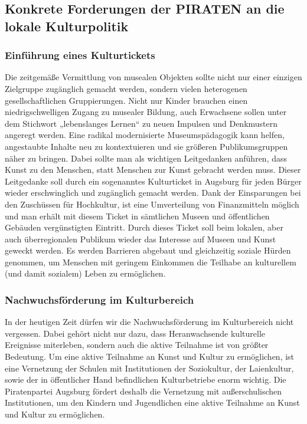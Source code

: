   \subsection{Konkrete Forderungen der PIRATEN an die lokale Kulturpolitik}
  
  \subsubsection{Einführung eines Kulturtickets}
  
  Die zeitgemäße Vermittlung von musealen Objekten sollte nicht nur einer 
  einzigen Zielgruppe zugänglich gemacht werden, sondern vielen heterogenen 
  gesellschaftlichen Gruppierungen. Nicht nur Kinder brauchen einen 
  niedrigschwelligen Zugang zu musealer Bildung, auch Erwachsene sollen unter 
  dem Stichwort „lebenslanges Lernen“ zu neuen Impulsen und Denkmustern 
  angeregt werden. Eine radikal modernisierte Museumspädagogik kann helfen, 
  angestaubte Inhalte neu zu kontextuieren und sie größeren Publikumsgruppen 
  näher zu bringen. Dabei sollte man als wichtigen Leitgedanken anführen, 
  dass Kunst zu den Menschen, statt Menschen zur Kunst gebracht werden muss. 
  Dieser Leitgedanke soll durch ein sogenanntes Kulturticket in Augsburg für 
  jeden Bürger wieder erschwinglich und zugänglich gemacht werden. Dank der 
  Einsparungen bei den Zuschüssen für Hochkultur, ist eine Umverteilung von 
  Finanzmitteln möglich und man erhält mit diesem Ticket in sämtlichen Museen 
  und öffentlichen Gebäuden vergünstigten Eintritt. Durch dieses Ticket soll 
  beim lokalen, aber auch überregionalen Publikum wieder das Interesse auf 
  Museen und Kunst geweckt werden. Es werden Barrieren abgebaut und 
  gleichzeitig soziale Hürden genommen, um Menschen mit geringem Einkommen 
  die Teilhabe an kulturellem (und damit sozialem) Leben zu ermöglichen.
  
  \subsubsection{Nachwuchsförderung im Kulturbereich}
  
  In der heutigen Zeit dürfen wir die Nachwuchsförderung im Kulturbereich 
  nicht vergessen. Dabei gehört nicht nur dazu, dass Heranwachsende 
  kulturelle Ereignisse miterleben, sondern auch die aktive Teilnahme ist von 
  größter Bedeutung. Um eine aktive Teilnahme an Kunst und Kultur zu 
  ermöglichen, ist eine Vernetzung der Schulen mit Institutionen der 
  Soziokultur, der Laienkultur, sowie der in öffentlicher Hand befindlichen 
  Kulturbetriebe enorm wichtig. Die Piratenpartei Augsburg fördert deshalb die 
  Vernetzung mit außerschulischen Institutionen, um den Kindern und 
  Jugendlichen eine aktive Teilnahme an Kunst und Kultur zu ermöglichen.
  

